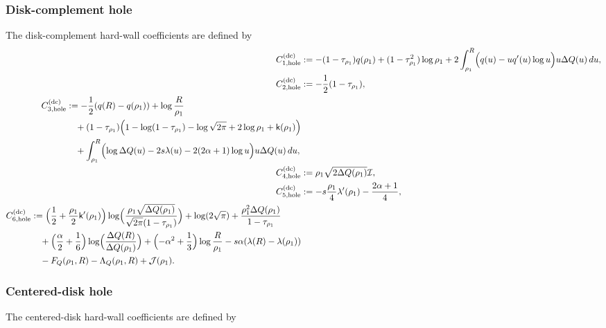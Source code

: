 \documentclass[a4paper]{article}
\numberwithin{equation}{section}
\begin{document}
\subsubsection{Disk-complement hole}
The disk-complement hard-wall coefficients are defined by
\begin{align}
\label{def of C1dc hole}
C_{1,\mathrm{hole}}^{(\mathrm{dc})}
&:=
-(1-\tau_{\rho_1})q(\rho_1)+(1-\tau_{\rho_1}^2)\log\rho_1
+2\int_{\rho_1}^{R}\Bigl(q(u)-uq'(u)\log u\Bigr)u\Delta Q(u)\,du,
\\
\label{def of C2dc hole}
C_{2,\mathrm{hole}}^{(\mathrm{dc})}
&:=
-\frac{1}{2}(1-\tau_{\rho_1}), 
\\
\begin{split}
\label{def of C3dc hole}
C_{3,\mathrm{hole}}^{(\mathrm{dc})}
&:=
-\frac{1}{2}(q(R)-q(\rho_1))
+\log \frac{R}{\rho_1}
\\
&\quad
+(1-\tau_{\rho_1})\Bigl(1-\log(1-\tau_{\rho_1})-\log\sqrt{2\pi}+2\log \rho_1+\mathsf{k}(\rho_1)\Bigr)
\\
&\quad
+\int_{\rho_1}^{R}
\Bigl(\log \Delta Q(u)-2s\lambda(u)-2(2\alpha+1)\log u\Bigr)u\Delta Q(u)\,du,
\end{split}
\\
\label{def of C4dc hole}
C_{4,\mathrm{hole}}^{(\mathrm{dc})}
&:=
\rho_1\sqrt{2\Delta Q(\rho_1)}\mathcal{I},
\\
\label{def of C5dc hole}
C_{5,\mathrm{hole}}^{(\mathrm{dc})}
&:=
-s\frac{\rho_1}{4}\lambda'(\rho_1)
-\frac{2\alpha+1}{4}, 
\\
\begin{split}
\label{def of C6dc hole}
C_{6,\mathrm{hole}}^{(\mathrm{dc})}
&:=
\Bigl(\frac{1}{2}+\frac{\rho_1}{2}\mathsf{k}'(\rho_1)\Bigr)
\log\Bigl(\frac{\rho_1\sqrt{\Delta Q(\rho_1)}}{\sqrt{2\pi}(1-\tau_{\rho_1})}\Bigr)
+\log(2\sqrt{\pi})
+\frac{\rho_1^2\Delta Q(\rho_1)}{1-\tau_{\rho_1}}
\\
&\quad
+\Bigl(\frac{\alpha}{2}+\frac{1}{6}\Bigr)\log \Bigl(\frac{\Delta Q(R)}{\Delta Q(\rho_1)}\Bigr)
+\Bigl(-\alpha^2+\frac{1}{3}\Bigr)\log\frac{R}{\rho_1}
-s\alpha(\lambda(R)-\lambda(\rho_1))
\\
&\quad
-F_Q(\rho_1,R)-\Lambda_Q(\rho_1,R)
+\mathcal{J}(\rho_1). 
\end{split}
\end{align}

\subsubsection{Centered-disk hole}
The centered-disk hard-wall coefficients are defined by
\end{document}
